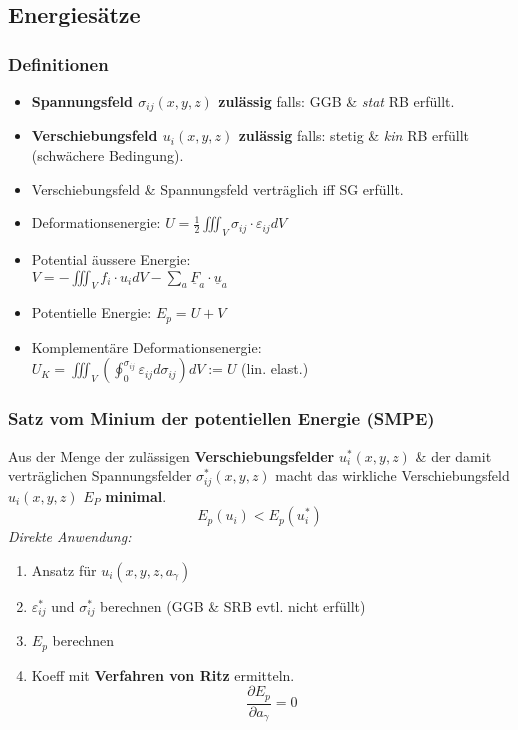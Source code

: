     \subsection{Energiesätze}
        \subsubsection{Definitionen}
            \begin{itemize}
                \item \textbf{Spannungsfeld $\sigma_{ij}(x,y,z)$ zulässig} falls: GGB \& \textit{stat} RB erfüllt.
                \item \textbf{Verschiebungsfeld $u_i(x,y,z)$ zulässig} falls: stetig \& \textit{kin} RB erfüllt (schwächere Bedingung).
                \item Verschiebungsfeld \& Spannungsfeld verträglich iff SG erfüllt.
                \item Deformationsenergie: $U=\frac{1}{2}\iiint_V \sigma_{ij}\cdot\varepsilon_{ij}dV$
                \item Potential äussere Energie:\\
                $V=-\iiint_V f_i\cdot u_idV-\sum_{a}\underline{F}_a\cdot\underline{u}_a$
                \item Potentielle Energie: $E_p=U+V$
                \item Komplementäre Deformationsenergie:\\ $U_K=\iiint_V(\oint_0^{\sigma_{ij}}\varepsilon_{ij}d\sigma_{ij})dV := U$  (lin. elast.)
            \end{itemize}
        \vspace{2mm}
        \subsubsection{Satz vom Minium der potentiellen Energie (SMPE)}
            Aus der Menge der zulässigen \textbf{Verschiebungsfelder} $u_i^*(x,y,z)$ \& der damit verträglichen Spannungsfelder $\sigma_{ij}^*(x,y,z)$ macht das wirkliche Verschiebungsfeld $u_i(x,y,z)$ $E_P$ \textbf{minimal}.
            \[E_p(u_i) < E_p(u_i^*)\]
            \textit{Direkte Anwendung:}
            \begin{enumerate}
                \item Ansatz für $u_i(x,y,z,a_{\gamma})$
                \item $\varepsilon_{ij}^*$ und $\sigma_{ij}^*$ berechnen (GGB \& SRB evtl. nicht erfüllt)
                \item $E_p$ berechnen
                \item Koeff mit \textbf{Verfahren von Ritz} ermitteln.
                \[\frac{\partial E_p}{\partial a_{\gamma}} =0\]
            \end{enumerate}
            
